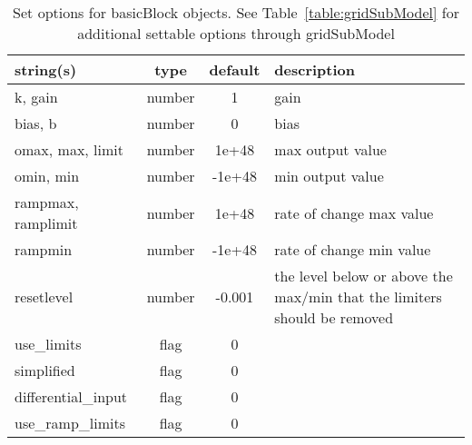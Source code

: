 \begin{table}[ht]
\centering
\begin{tabular}{p{5cm} c c p{7cm}}
\hline
string(s) & type & default & description \\
\hline
k, gain & number & 1 & gain\\
bias, b & number & 0 & bias\\
omax, max, limit & number & 1e+48 & max output value\\
omin, min & number & -1e+48 & min output value\\
rampmax, ramplimit & number & 1e+48 & rate of change max value\\
rampmin & number & -1e+48 & rate of change min value\\
resetlevel & number & -0.001 & the level below or above the max/min that the limiters should be removed\\
use\_limits & flag & 0 & \\
simplified & flag & 0 & \\
differential\_input & flag & 0 & \\
use\_ramp\_limits & flag & 0 & \\
\hline
\end{tabular}
\caption{Set options for basicBlock objects. See Table~\ref{table:gridSubModel} for additional settable options through gridSubModel}
\label{table:basicBlock}
\end{table}
